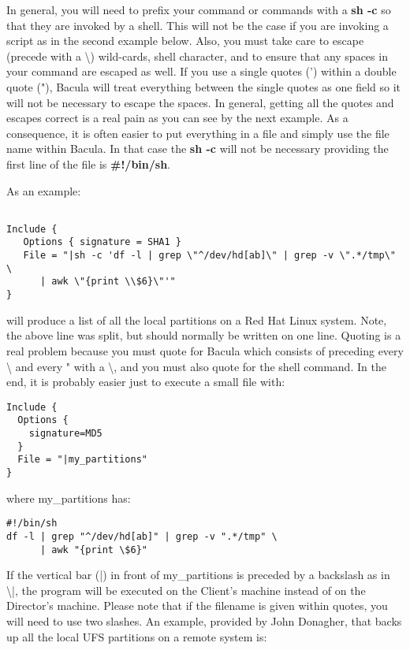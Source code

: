\begin{itemize}
   In general, you will need to prefix your command or commands with a {\bf
   sh -c} so that they are invoked by a shell.  This will not be the case
   if you are invoking a script as in the second example below.  Also, you
   must take care to escape (precede with a \textbackslash{}) wild-cards,
   shell character, and to ensure that any spaces in your command are
   escaped as well.  If you use a single quotes (') within a double quote
   ("), Bacula will treat everything between the single quotes as one field
   so it will not be necessary to escape the spaces.  In general, getting
   all the quotes and escapes correct is a real pain as you can see by the
   next example.  As a consequence, it is often easier to put everything in
   a file and simply use the file name within Bacula.  In that case the
   {\bf sh -c} will not be necessary providing the first line of the file
   is {\bf \#!/bin/sh}.

   As an  example: 

\footnotesize
\begin{verbatim}
 
Include {
   Options { signature = SHA1 }
   File = "|sh -c 'df -l | grep \"^/dev/hd[ab]\" | grep -v \".*/tmp\" \
      | awk \"{print \\$6}\"'"
}
\end{verbatim}
\normalsize

   will produce a list of all the local partitions on a Red Hat Linux system.
   Note, the above line was split, but should normally  be written on one line. 
   Quoting is a real problem because you must quote for Bacula  which consists of
   preceding every \textbackslash{} and every " with a \textbackslash{}, and 
   you must also quote for the shell command. In the end, it is probably  easier
   just to execute a small file with: 


\footnotesize
\begin{verbatim}
Include {
  Options {
    signature=MD5
  }
  File = "|my_partitions"
}
\end{verbatim}
\normalsize

   where my\_partitions has: 

\footnotesize
\begin{verbatim}
#!/bin/sh
df -l | grep "^/dev/hd[ab]" | grep -v ".*/tmp" \
      | awk "{print \$6}"
\end{verbatim}
\normalsize

   If the vertical bar (|) in front of my\_partitions is preceded by a
   backslash as in \textbackslash{}|, the program will be executed on the
   Client's machine instead of on the Director's machine.
   Please note that if the filename is given within quotes, you
   will need to use two slashes.  An example, provided by John Donagher,
   that backs up all the local UFS partitions on a remote system is:


\end{itemize}

